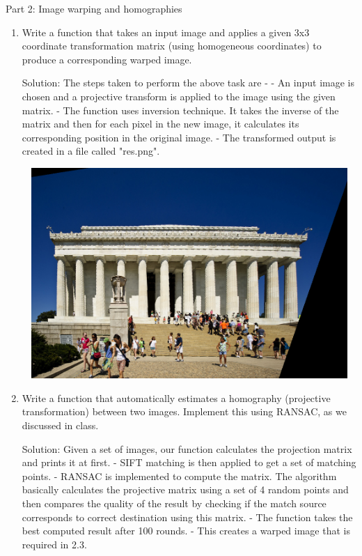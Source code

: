 \documentclass{article}
\begin{document}
	
	Part 2: Image warping and homographies
	\begin{enumerate}
		\item Write a function that takes an input image and applies a given 3x3 coordinate transformation matrix (using homogeneous coordinates) to produce a corresponding warped image.
		
		Solution: The steps taken to perform the above task are - \newline
		- An input image is chosen and a projective transform is applied to the image using the given matrix. \newline
		- The function uses inversion technique. It takes the inverse of the matrix and then for each pixel in the new image, it calculates its corresponding position in the original image. \newline
		- The transformed output is created in a file called "res.png". 
		\begin{center}
			\includegraphics[width=16cm, height=8cm]{res.png} \\
		\end{center}
		
		\item Write a function that automatically estimates a homography (projective transformation) between two images. Implement this using RANSAC, as we discussed
		in class. 
		
		Solution: Given a set of images, our function calculates the projection matrix and prints it at first. \newline
		- SIFT matching is then applied to get a set of matching points. \newline
		- RANSAC is implemented to compute the matrix. The algorithm basically calculates the projective matrix using a set of 4 random points and then compares the quality of the result by checking if the match source corresponds to correct destination using this matrix. \newline
		- The function takes the best computed result after 100 rounds. \newline
		- This creates a warped image that is required in 2.3. 
		

\end{enumerate}
\end{document}
